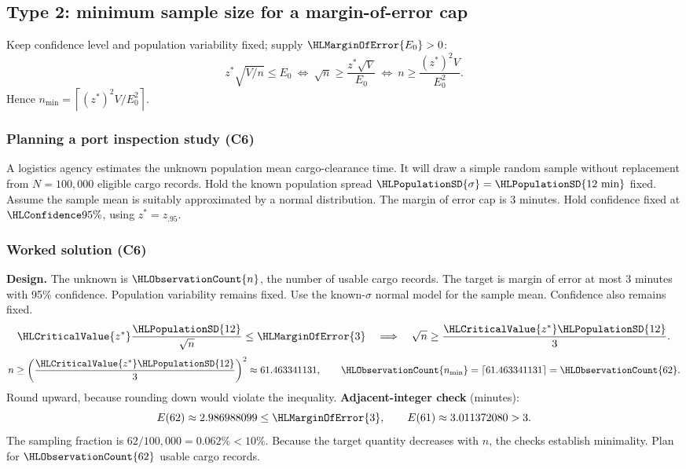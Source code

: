 \clearpage
\subsection{Type 2: minimum sample size for a margin-of-error cap}\label{prob:t2}
Keep confidence level and population variability fixed; supply $\HLMarginOfError{E_0}>0$:
\[
z^*\sqrt{V/n}\le E_0
\ \Longleftrightarrow\ \sqrt n\ge\frac{z^*\sqrt V}{E_0}
\ \Longleftrightarrow\ n\ge\frac{(z^*)^2V}{E_0^2}.
\]
Hence $n_{\min}=\left\lceil (z^*)^2V/E_0^2\right\rceil$.
\medskip
\subsubsection{Planning a port inspection study (C6)}\label{prob:c6-1}
A logistics agency estimates the unknown population mean cargo-clearance time. It will draw a simple random sample without replacement from $N=100{,}000$ eligible cargo records. Hold the known population spread $\HLPopulationSD{\sigma}=\HLPopulationSD{12\text{ min}}$ fixed. Assume the sample mean is suitably approximated by a normal distribution. The margin of error cap is 3 minutes. Hold confidence fixed at $\HLConfidence{95\%}$, using $z^*=z_{.95}$. 
\subsubsection*{Worked solution (C6)}\label{sol:c6-1}
\label{sol:c6-1-a}\label{sol:c6-1-b}
\textbf{Design.} The unknown is $\HLObservationCount{n}$, the number of usable cargo records. The target is margin of error at most 3 minutes with 95\% confidence. Population variability remains fixed. Use the known-$\sigma$ normal model for the sample mean. Confidence also remains fixed. 
\[
\HLCriticalValue{z^*}\frac{\HLPopulationSD{12}}{\sqrt n}\le \HLMarginOfError{3}\quad\Longrightarrow\quad\sqrt n\ge\frac{\HLCriticalValue{z^*}\HLPopulationSD{12}}{3}.
\]
\[n\ge\left(\frac{\HLCriticalValue{z^*}\HLPopulationSD{12}}{3}\right)^2\approx61.463341131,\qquad \HLObservationCount{n_{\min}}=\left\lceil 61.463341131\right\rceil=\HLObservationCount{62}.\]
Round upward, because rounding down would violate the inequality.
\textbf{Adjacent-integer check} (minutes):
\[ E(62)\approx2.986988099\le \HLMarginOfError{3},\qquad E(61)\approx3.011372080>3.\]
The sampling fraction is $62/100{,}000=0.062\%<10\%$. Because the target quantity decreases with $n$, the checks establish minimality. Plan for $\HLObservationCount{62}$ usable cargo records. 
\clearpage
